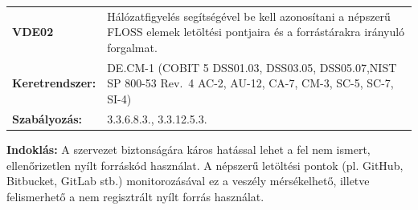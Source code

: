 \documentclass[12pt,magyar,a4paper,oneside]{scrreprt}
\begin{document}
\begin{longtable}[]{@{}ll@{}}
\toprule
\endhead
\begin{minipage}[t]{0.16\columnwidth}\raggedright
\textbf{VDE02}\strut
\end{minipage} & \begin{minipage}[t]{0.79\columnwidth}\raggedright
Hálózatfigyelés segítségével be kell azonosítani a népszerű FLOSS elemek
letöltési pontjaira és a forrástárakra irányuló forgalmat.\strut
\end{minipage}\tabularnewline
\begin{minipage}[t]{0.16\columnwidth}\raggedright
\textbf{Keretrendszer:}\strut
\end{minipage} & \begin{minipage}[t]{0.79\columnwidth}\raggedright
DE.CM-1 (COBIT 5 DSS01.03, DSS03.05, DSS05.07,NIST SP 800-53 Rev.~4
AC-2, AU-12, CA-7, CM-3, SC-5, SC-7, SI-4)\strut
\end{minipage}\tabularnewline
\begin{minipage}[t]{0.16\columnwidth}\raggedright
\textbf{Szabályozás:}\strut
\end{minipage} & \begin{minipage}[t]{0.79\columnwidth}\raggedright
3.3.6.8.3., 3.3.12.5.3.\strut
\end{minipage}\tabularnewline
\bottomrule
\end{longtable}

\textbf{Indoklás: } A szervezet biztonságára káros hatással lehet a fel
nem ismert, ellenőrizetlen nyílt forráskód használat. A népszerű
letöltési pontok (pl. GitHub, Bitbucket, GitLab stb.) monitorozásával ez
a veszély mérsékelhető, illetve felismerhető a nem regisztrált nyílt
forrás használat.
\end{document}
